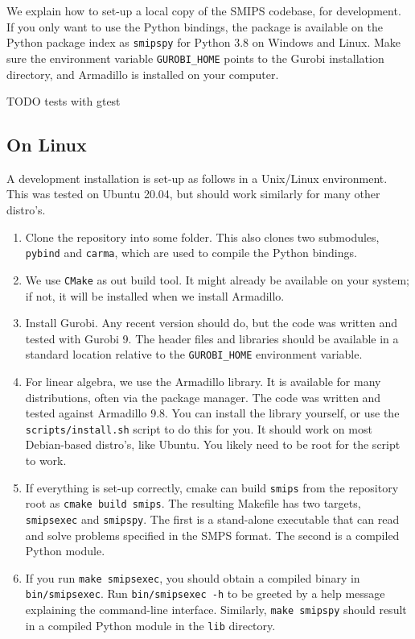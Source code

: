 \documentclass[12pt, english]{article}
\begin{document}
We explain how to set-up a local copy of the SMIPS codebase, for development. If you only want to use the Python bindings, the package is available on the Python package index as \texttt{smipspy} for Python 3.8 on Windows and Linux. Make sure the environment variable \texttt{GUROBI\_HOME} points to the Gurobi installation directory, and Armadillo is installed on your computer. 

TODO tests with gtest

\subsection{On Linux}
A development installation is set-up as follows in a Unix/Linux environment. This was tested on Ubuntu 20.04, but should work similarly for many other distro's.
\begin{enumerate}
	\item Clone the repository into some folder. This also clones two submodules, \texttt{pybind} and \texttt{carma}, which are used to compile the Python bindings.
	
	\item We use \texttt{CMake} as out build tool. It might already be available on your system; if not, it will be installed when we install Armadillo.
	
	\item Install Gurobi. Any recent version should do, but the code was written and tested with Gurobi 9. The header files and libraries should be available in a standard location relative to the \texttt{GUROBI\_HOME} environment variable.
	
	\item For linear algebra, we use the Armadillo library. It is available for many distributions, often via the package manager. The code was written and tested against Armadillo 9.8. You can install the library yourself, or use the \texttt{scripts/install.sh} script to do this for you. It should work on most Debian-based distro's, like Ubuntu. You likely need to be root for the script to work.
	
	\item If everything is set-up correctly, cmake can build \texttt{smips} from the repository root as \texttt{cmake build smips}. The resulting Makefile has two targets, \texttt{smipsexec} and \texttt{smipspy}. The first is a stand-alone executable that can read and solve problems specified in the SMPS format. The second is a compiled Python module. 
	
	\item If you run \texttt{make smipsexec}, you should obtain a compiled binary in \texttt{bin/smipsexec}. Run \texttt{bin/smipsexec -h} to be greeted by a help message explaining the command-line interface. Similarly, \texttt{make smipspy} should result in a compiled Python module in the \texttt{lib} directory.
\end{enumerate}
\end{document}
